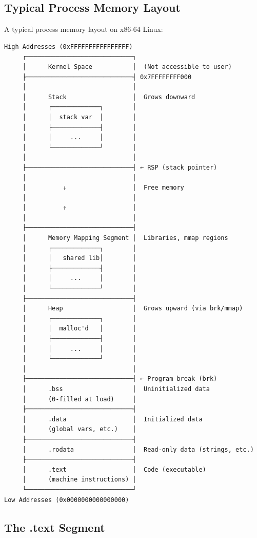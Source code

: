 \subsection{Typical Process Memory Layout}

A typical process memory layout on x86-64 Linux:

\begin{verbatim}
High Addresses (0xFFFFFFFFFFFFFFFF)
     ┌─────────────────────────────┐
     │      Kernel Space           │  (Not accessible to user)
     ├─────────────────────────────┤ 0x7FFFFFFFF000
     │                             │
     │      Stack                  │  Grows downward
     │      ┌─────────────┐        │
     │      │  stack var  │        │
     │      ├─────────────┤        │
     │      │     ...     │        │
     │      └─────────────┘        │
     │                             │
     ├─────────────────────────────┤ ← RSP (stack pointer)
     │                             │
     │          ↓                  │  Free memory
     │                             │
     │          ↑                  │
     │                             │
     ├─────────────────────────────┤
     │      Memory Mapping Segment │  Libraries, mmap regions
     │      ┌─────────────┐        │
     │      │   shared lib│        │
     │      ├─────────────┤        │
     │      │     ...     │        │
     │      └─────────────┘        │
     ├─────────────────────────────┤
     │      Heap                   │  Grows upward (via brk/mmap)
     │      ┌─────────────┐        │
     │      │  malloc'd   │        │
     │      ├─────────────┤        │
     │      │     ...     │        │
     │      └─────────────┘        │
     │                             │
     ├─────────────────────────────┤ ← Program break (brk)
     │      .bss                   │  Uninitialized data
     │      (0-filled at load)     │
     ├─────────────────────────────┤
     │      .data                  │  Initialized data
     │      (global vars, etc.)    │
     ├─────────────────────────────┤
     │      .rodata                │  Read-only data (strings, etc.)
     ├─────────────────────────────┤
     │      .text                  │  Code (executable)
     │      (machine instructions) │
     └─────────────────────────────┘
Low Addresses (0x0000000000000000)
\end{verbatim}

\subsection{The .text Segment}

